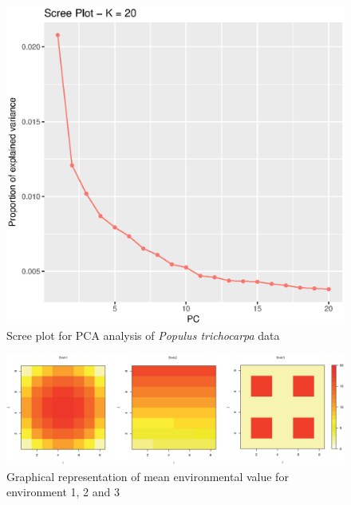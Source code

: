 \documentclass[a4paper,times,10pt,authoryear]{article}%
\begin{document}
\begin{figure}[t]
\begin{center}
\includegraphics[height=0.25\textheight]{figures/screeplot-pca.eps}
\end{center}
\caption{Scree plot for PCA analysis of \textit{Populus trichocarpa} data}%
\label{fig:screeplotpca}%
\end{figure}

\begin{figure}[t]
\begin{center}
\includegraphics[height=0.25\textheight]{figures/simulatedenvironment.eps}
\end{center}
\caption{Graphical representation of mean environmental value for environment 1, 2 and 3}%
\label{fig:simulatedenvir}%
\end{figure}
\end{document}
